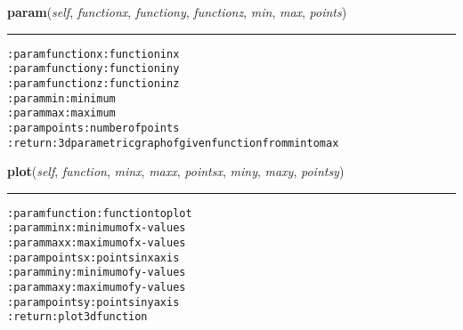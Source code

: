     \label{hal:charts:plotter:Plot3d:param}

    \vspace{0.5ex}

\hspace{.8\funcindent}\begin{boxedminipage}{\funcwidth}

    \raggedright \textbf{param}(\textit{self}, \textit{functionx}, \textit{functiony}, \textit{functionz}, \textit{min}, \textit{max}, \textit{points})

    \vspace{-1.5ex}

    \rule{\textwidth}{0.5\fboxrule}
\setlength{\parskip}{2ex}
\begin{alltt}

:param functionx: function in x
:param functiony: function in y
:param functionz: function in z
:param min: minimum
:param max: maximum
:param points: number of points
:return: 3d parametric graph of given function from min to max
\end{alltt}

\setlength{\parskip}{1ex}
    \end{boxedminipage}

    \label{hal:charts:plotter:Plot3d:plot}

    \vspace{0.5ex}

\hspace{.8\funcindent}\begin{boxedminipage}{\funcwidth}

    \raggedright \textbf{plot}(\textit{self}, \textit{function}, \textit{minx}, \textit{maxx}, \textit{pointsx}, \textit{miny}, \textit{maxy}, \textit{pointsy})

    \vspace{-1.5ex}

    \rule{\textwidth}{0.5\fboxrule}
\setlength{\parskip}{2ex}
\begin{alltt}

:param function: function to plot
:param minx: minimum of x-values
:param maxx: maximum of x-values
:param pointsx: points in x axis
:param miny: minimum of y-values
:param maxy: maximum of y-values
:param pointsy: points in y axis
:return: plot 3d function
\end{alltt}

\setlength{\parskip}{1ex}
    \end{boxedminipage}


